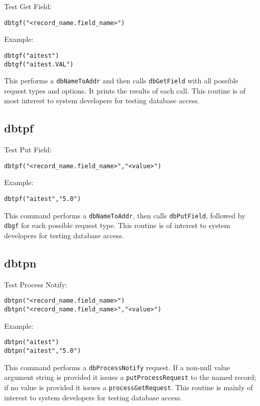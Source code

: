 Test Get Field:

\begin{verbatim}
dbtgf("<record_name.field_name>")
\end{verbatim}

Example:

\begin{verbatim}
dbtgf("aitest")
dbtgf("aitest.VAL")
\end{verbatim}

This performs a \verb|dbNameToAddr| and then calls \verb|dbGetField| with all possible request types and options. It prints the 
results of each call. This routine is of most interest to system developers for testing database access.

\subsection{dbtpf}

Test Put Field:

\begin{verbatim}
dbtpf("<record_name.field_name>","<value>")
\end{verbatim}

Example:

\begin{verbatim}
dbtpf("aitest","5.0")
\end{verbatim}

This command performs a \verb|dbNameToAddr|, then calls \verb|dbPutField|, followed by \verb|dbgf| for each possible request type. 
This routine is of interest to system developers for testing database access.

\subsection{dbtpn}

Test Process Notify:

\begin{verbatim}
dbtpn("<record_name.field_name>")
dbtpn("<record_name.field_name>","<value>")
\end{verbatim}

Example:

\begin{verbatim}
dbtpn("aitest")
dbtpn("aitest","5.0")
\end{verbatim}

This command performs a \verb|dbProcessNotify| request.
If a non-null value argument string is provided it issues a \verb|putProcessRequest| to the named record;
if no value is provided it issues a \verb|processGetRequest|.
This routine is mainly of interest to system developers for testing database access.

